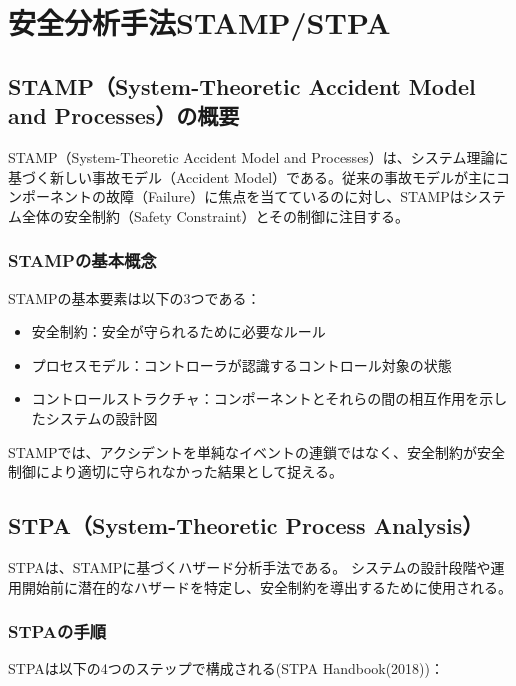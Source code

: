 \chapter{安全分析手法STAMP/STPA}
\label{chap3}

\section{STAMP（System-Theoretic Accident Model and Processes）の概要}

STAMP（System-Theoretic Accident Model and Processes）は、システム理論に基づく新しい事故モデル（Accident Model）である。従来の事故モデルが主にコンポーネントの故障（Failure）に焦点を当てているのに対し、STAMPはシステム全体の安全制約（Safety Constraint）とその制御に注目する。

\subsection{STAMPの基本概念}

STAMPの基本要素は以下の3つである： %

\begin{itemize}
    \item 安全制約：安全が守られるために必要なルール
    \item プロセスモデル：コントローラが認識するコントロール対象の状態
    \item コントロールストラクチャ：コンポーネントとそれらの間の相互作用を示したシステムの設計図
\end{itemize}

STAMPでは、アクシデントを単純なイベントの連鎖ではなく、安全制約が安全制御により適切に守られなかった結果として捉える。

\section{STPA（System-Theoretic Process Analysis）}

STPAは、STAMPに基づくハザード分析手法である。
システムの設計段階や運用開始前に潜在的なハザードを特定し、安全制約を導出するために使用される。

\subsection{STPAの手順}

STPAは以下の4つのステップで構成される(STPA Handbook(2018))：

